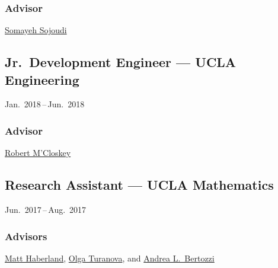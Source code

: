 \documentclass[11pt]{article}
\newcommand{\subsectionskip}{\baselineskip}	%
\newcommand{\cvdates}[2]{\hfill#1\,--\,#2}	%
\begin{document}
	\subsubsection{Advisor}
	\href{https://people.eecs.berkeley.edu/~sojoudi/}{Somayeh Sojoudi}
	
	\vspace*{\subsectionskip}
	
	\subsection{Jr.\ Development Engineer --- UCLA Engineering}
	\cvdates{Jan.\ 2018}{Jun.\ 2018}
	
	\subsubsection{Advisor}
	\href{http://www.seas.ucla.edu/mcloskey/}{Robert M'Closkey}
	
	\vspace*{\subsectionskip}
	
	\subsection{Research Assistant --- UCLA Mathematics}
	\cvdates{Jun.\ 2017}{Aug.\ 2017}
	
	\subsubsection{Advisors}
	\href{https://brae.calpoly.edu/faculty-and-staff-haberland}{Matt Haberland}, \href{https://sites.google.com/msu.edu/turanova/home}{Olga Turanova}, and \href{http://www.math.ucla.edu/~bertozzi/}{Andrea L.\ Bertozzi}

	\newpage
\end{document}
